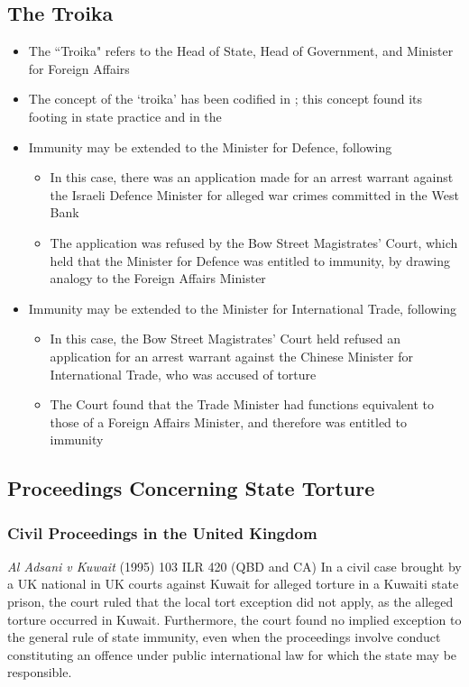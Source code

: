 \subsection{The Troika}
\begin{itemize}
    \item The ``Troika" refers to the Head of State, Head of Government, and Minister for Foreign Affairs
    \item The concept of the `troika' has been codified in ; this concept found its footing in state practice and in the 
    \item Immunity may be extended to the Minister for Defence, following 
    \begin{itemize}
        \item In this case, there was an application made for an arrest warrant against the Israeli Defence Minister for alleged war crimes committed in the West Bank
        \item The application was refused by the Bow Street Magistrates' Court, which held that the Minister for Defence was entitled to immunity, by drawing analogy to the Foreign Affairs Minister
    \end{itemize}
    \item Immunity may be extended to the Minister for International Trade, following 
    \begin{itemize}
        \item In this case, the Bow Street Magistrates' Court held refused an application for an arrest warrant against the Chinese Minister for International Trade, who was accused of torture
        \item The Court found that the Trade Minister had functions equivalent to those of a Foreign Affairs Minister, and therefore was entitled to immunity
    \end{itemize}
\end{itemize}

\subsection{Proceedings Concerning State Torture}
\subsubsection{Civil Proceedings in the United Kingdom}
\begin{casedetails}{\textit{Al Adsani v Kuwait} (1995) 103 ILR 420 (QBD and CA)}
    \flushleft
    In a civil case brought by a UK national in UK courts against Kuwait for alleged torture in a Kuwaiti state prison, the court ruled that the local tort exception did not apply, as the alleged torture occurred in Kuwait. Furthermore, the court found no implied exception to the general rule of state immunity, even when the proceedings involve conduct constituting an offence under public international law for which the state may be responsible.
\end{casedetails}

